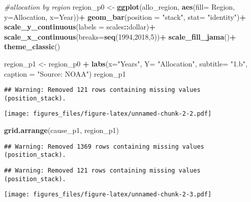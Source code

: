 \documentclass[]{article}
\newenvironment{Shaded}{\begin{snugshade}}{\end{snugshade}}
\newcommand{\CommentTok}[1]{\textcolor[rgb]{0.56,0.35,0.01}{\textit{#1}}}
\newcommand{\DataTypeTok}[1]{\textcolor[rgb]{0.13,0.29,0.53}{#1}}
\newcommand{\DecValTok}[1]{\textcolor[rgb]{0.00,0.00,0.81}{#1}}
\newcommand{\KeywordTok}[1]{\textcolor[rgb]{0.13,0.29,0.53}{\textbf{#1}}}
\newcommand{\NormalTok}[1]{#1}
\newcommand{\OperatorTok}[1]{\textcolor[rgb]{0.81,0.36,0.00}{\textbf{#1}}}
\newcommand{\StringTok}[1]{\textcolor[rgb]{0.31,0.60,0.02}{#1}}
\begin{document}
\begin{Shaded}
\begin{Highlighting}[]
\CommentTok{#allocation by region}
\NormalTok{region_p0 <-}\StringTok{ }\KeywordTok{ggplot}\NormalTok{(allo_region, }\KeywordTok{aes}\NormalTok{(}\DataTypeTok{fill=}\NormalTok{ Region, }\DataTypeTok{y=}\NormalTok{Allocation, }\DataTypeTok{x=}\NormalTok{Year))}\OperatorTok{+}
\StringTok{  }\KeywordTok{geom_bar}\NormalTok{(}\DataTypeTok{position =} \StringTok{"stack"}\NormalTok{, }\DataTypeTok{stat=} \StringTok{"identity"}\NormalTok{)}\OperatorTok{+}
\StringTok{  }\KeywordTok{scale_y_continuous}\NormalTok{(}\DataTypeTok{labels =}\NormalTok{ scales}\OperatorTok{::}\NormalTok{dollar)}\OperatorTok{+}
\StringTok{  }\KeywordTok{scale_x_continuous}\NormalTok{(}\DataTypeTok{breaks=}\KeywordTok{seq}\NormalTok{(}\DecValTok{1994}\NormalTok{,}\DecValTok{2018}\NormalTok{,}\DecValTok{5}\NormalTok{))}\OperatorTok{+}
\StringTok{  }\KeywordTok{scale_fill_jama}\NormalTok{()}\OperatorTok{+}
\StringTok{  }\KeywordTok{theme_classic}\NormalTok{()}

\NormalTok{region_p1 <-}\StringTok{ }\NormalTok{region_p0 }\OperatorTok{+}\StringTok{ }\KeywordTok{labs}\NormalTok{(}\DataTypeTok{x=}\StringTok{"Years"}\NormalTok{,}
                \DataTypeTok{Y=} \StringTok{"Allocation"}\NormalTok{,}
                \DataTypeTok{subtitle=} \StringTok{"1.b"}\NormalTok{,}
                \DataTypeTok{caption =} \StringTok{"Source: NOAA"}\NormalTok{)}
\NormalTok{region_p1}
\end{Highlighting}
\end{Shaded}

\begin{verbatim}
## Warning: Removed 121 rows containing missing values (position_stack).
\end{verbatim}

\texttt{[image: figures\_files/figure-latex/unnamed-chunk-2-2.pdf]}

\begin{Shaded}
\begin{Highlighting}[]
\KeywordTok{grid.arrange}\NormalTok{(cause_p1, region_p1)}
\end{Highlighting}
\end{Shaded}

\begin{verbatim}
## Warning: Removed 1369 rows containing missing values (position_stack).
\end{verbatim}

\begin{verbatim}
## Warning: Removed 121 rows containing missing values (position_stack).
\end{verbatim}

\texttt{[image: figures\_files/figure-latex/unnamed-chunk-2-3.pdf]}
\end{document}
